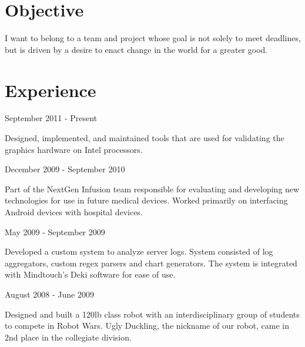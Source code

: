 \documentclass{resume}
\author{Ricky Ng}
\date{December 16, 2012}
\begin{document}
\maketitle

\section{Objective}
I want to belong to a team and project whose goal is not solely to meet deadlines, but is driven by a desire to enact change in the world for a greater good. 

\section{Experience}
	{September 2011 - Present}
\begin{compactitem}
	\item Designed, implemented, and maintained tools that are used for validating the graphics hardware on Intel processors. 
\end{compactitem}

	{December 2009 - September 2010}
\begin{compactitem}
	\item Part of the NextGen Infusion team responsible for evaluating and developing new technologies for use in future medical devices. Worked primarily on interfacing Android devices with hospital devices.
\end{compactitem}

	{May 2009 - September 2009}
\begin{compactitem}
	\item Developed a custom system to analyze server logs. System consisted of log aggregators, custom regex parsers and chart generators. The system is integrated with Mindtouch's Deki software for ease of use.
\end{compactitem}

	{August 2008 - June 2009}
\begin{compactitem}
	\item Designed and built a 120lb class robot with an interdisciplinary group of students to compete in Robot Wars. Ugly Duckling, the nickname of our robot, came in 2nd place in the collegiate division. 
\end{compactitem}
\end{document}
